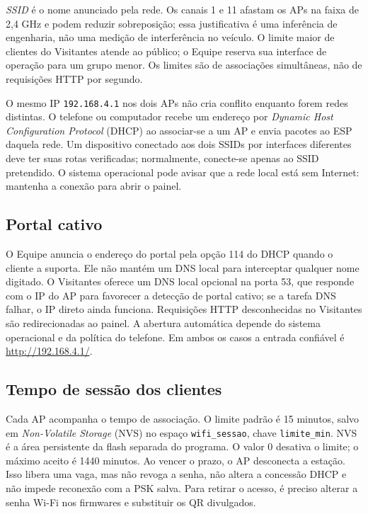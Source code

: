 \emph{SSID} é o nome anunciado pela rede. Os canais 1 e 11 afastam os APs na faixa de 2,4 GHz e podem reduzir sobreposição; essa justificativa é uma inferência de engenharia, não uma medição de interferência no veículo. O limite maior de clientes do Visitantes atende ao público; o Equipe reserva sua interface de operação para um grupo menor. Os limites são de associações simultâneas, não de requisições HTTP por segundo.

O mesmo IP \texttt{192.168.4.1} nos dois APs não cria conflito enquanto forem redes distintas. O telefone ou computador recebe um endereço por \emph{Dynamic Host Configuration Protocol} (DHCP) ao associar-se a um AP e envia pacotes ao ESP daquela rede. Um dispositivo conectado aos dois SSIDs por interfaces diferentes deve ter suas rotas verificadas; normalmente, conecte-se apenas ao SSID pretendido. O sistema operacional pode avisar que a rede local está sem Internet: mantenha a conexão para abrir o painel.

\subsection{Portal cativo}
O Equipe anuncia o endereço do portal pela opção 114 do DHCP quando o cliente a suporta. Ele não mantém um DNS local para interceptar qualquer nome digitado. O Visitantes oferece um DNS local opcional na porta 53, que responde com o IP do AP para favorecer a detecção de portal cativo; se a tarefa DNS falhar, o IP direto ainda funciona. Requisições HTTP desconhecidas no Visitantes são redirecionadas ao painel. A abertura automática depende do sistema operacional e da política do telefone. Em ambos os casos a entrada confiável é \url{http://192.168.4.1/}.

\subsection{Tempo de sessão dos clientes}
Cada AP acompanha o tempo de associação. O limite padrão é 15 minutos, salvo em \emph{Non-Volatile Storage} (NVS) no espaço \texttt{wifi\_sessao}, chave \texttt{limite\_min}. NVS é a área persistente da flash separada do programa. O valor 0 desativa o limite; o máximo aceito é 1440 minutos. Ao vencer o prazo, o AP desconecta a estação. Isso libera uma vaga, mas não revoga a senha, não altera a concessão DHCP e não impede reconexão com a PSK salva. Para retirar o acesso, é preciso alterar a senha Wi-Fi nos firmwares e substituir os QR divulgados.

